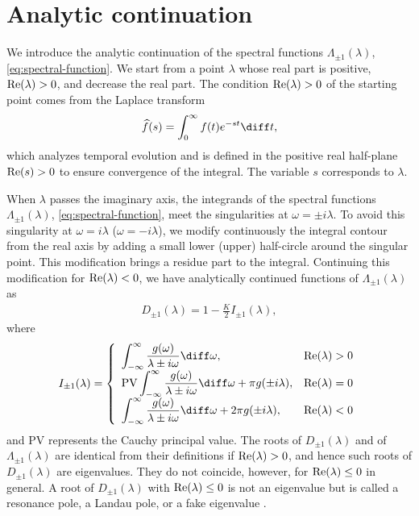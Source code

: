 \section{Analytic continuation}
\label{sec:analytic-continuation}

We introduce the analytic continuation of the spectral functions
$\Lambda_{\pm 1}(\lambda)$, \eqref{eq:spectral-function}.
We start from a point $\lambda$ whose real part is positive,
${\rm Re}(\lambda)>0$, and decrease the real part.
The condition ${\rm Re}(\lambda)>0$ of the starting point
comes from the Laplace transform \cite{strogatz1992}
\begin{align}
  \widehat{f}(s) = \int_{0}^{\infty} f(t) e^{-st} \diff t,
\end{align}
which analyzes temporal evolution and is defined in the positive
real half-plane ${\rm Re}(s)>0$ to ensure convergence of the integral.
The variable $s$ corresponds to $\lambda$.

When $\lambda$ passes the imaginary axis,
the integrands of the spectral functions $\Lambda_{\pm 1}(\lambda)$,
\eqref{eq:spectral-function},
meet the singularities at $\omega=\pm i\lambda$.
To avoid this singularity at $\omega=i\lambda$
($\omega=-i\lambda$),
we modify continuously the integral contour
from the real axis by adding a small lower (upper) half-circle
around the singular point.
This modification brings a residue part to the integral.
Continuing this modification for ${\rm Re}(\lambda)<0$,
we have analytically continued functions of $\Lambda_{\pm 1}(\lambda)$ as
\begin{align}
  D_{\pm 1}(\lambda) = 1 - \frac{K}{2} I_{\pm 1}(\lambda),
  \label{eq:d_lambda}
\end{align}
where 
\begin{align}
  I_{\pm 1}(\lambda) = \left\{
    \begin{array}{ll}
      \displaystyle{\int_{-\infty}^{\infty} \frac{g(\omega)}{\lambda\pm i\omega} \diff\omega}, & {\rm Re}(\lambda)>0 \\
      \displaystyle{{\rm PV}\int_{-\infty}^{\infty} \frac{g(\omega)}{\lambda\pm i\omega} \diff\omega} + \pi g(\pm i\lambda) , & {\rm Re}(\lambda)=0 \\
      \displaystyle{\int_{-\infty}^{\infty} \frac{g(\omega)}{\lambda\pm i\omega} \diff\omega} + 2\pi g(\pm i\lambda) , & {\rm Re}(\lambda)<0 \\
    \end{array}
  \right.
  \label{eq:integral}
\end{align}
and PV represents the Cauchy principal value.
The roots of $D_{\pm 1}(\lambda)$ and of $\Lambda_{\pm 1}(\lambda)$
are identical from their definitions if ${\rm Re}(\lambda)>0$,
  and hence such roots of $D_{\pm 1}(\lambda)$ are eigenvalues.
They do not coincide, however, for ${\rm Re}(\lambda)\leq 0$ in general.
A root of $D_{\pm 1}(\lambda)$ with ${\rm Re}(\lambda)\leq 0$
is not an eigenvalue but is called
a resonance pole, a Landau pole, or a fake eigenvalue \cite{ogawa2013}.

